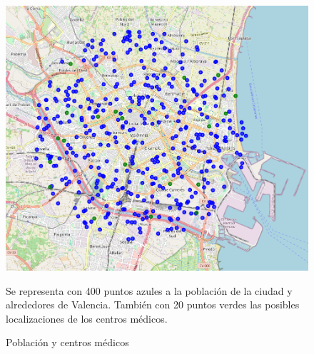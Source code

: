 \documentclass[12pt,a4paper]{book}
\begin{document}
\begin{figure}[H]
    \centering
    \begin{minipage}[c]{0.45\textwidth}
        \includegraphics[width=\textwidth]{images/ejemplo_centros_medicos.png}
        \label{fig:poblacion_centros_medicos}
    \end{minipage}
    \hfill
    \begin{minipage}[c]{0.45\textwidth}

        Se representa con 400 puntos azules a la población de la ciudad y alrededores de Valencia. También con 20 puntos verdes las posibles localizaciones de los centros médicos.
    \end{minipage}
    \caption{Población y centros médicos}
\end{figure}
\end{document}

